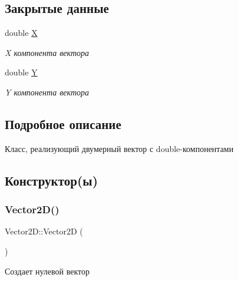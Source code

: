 \subsection*{Закрытые данные}
\begin{DoxyCompactItemize}
\item 
\mbox{\label{class_vector2_d_a6144dc7fbcc1de7ecd760db73c3fb377}} 
double \mbox{\hyperlink{class_vector2_d_a6144dc7fbcc1de7ecd760db73c3fb377}{X}}
\begin{DoxyCompactList}\small\item\em X компонента вектора \end{DoxyCompactList}\item 
\mbox{\label{class_vector2_d_a36ceeb774a2f648e34ba6ecb7a48f5c2}} 
double \mbox{\hyperlink{class_vector2_d_a36ceeb774a2f648e34ba6ecb7a48f5c2}{Y}}
\begin{DoxyCompactList}\small\item\em Y компонента вектора \end{DoxyCompactList}\end{DoxyCompactItemize}


\subsection{Подробное описание}
Класс, реализующий двумерный вектор с double-\/компонентами 

\subsection{Конструктор(ы)}
\mbox{\label{class_vector2_d_a98e9997ebb7a629f4db52397d4e0d653}} 
\subsubsection{\texorpdfstring{Vector2\+D()}{Vector2D()}\hspace{0.1cm}{\footnotesize\ttfamily [1/2]}}
{\footnotesize\ttfamily Vector2\+D\+::\+Vector2D (\begin{DoxyParamCaption}{ }\end{DoxyParamCaption})}

Создает нулевой вектор \mbox{\label{class_vector2_d_a0a97f6900bdb81fcefe6c37f1100532a}} 
